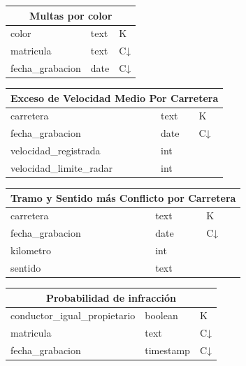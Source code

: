 \documentclass[]{article}
\begin{document}
\begin{minipage}{0.45\textwidth}
\begin{table}[H]
    \centering
    \begin{tabular}{lll} 
        \toprule
        \multicolumn{3}{c}{\large\textbf{Multas por color}} \\ 
        \midrule
        color            & text & K\\
        matricula        & text & C↓\\
        fecha\_grabacion & date & C↓\\
        \bottomrule
    \end{tabular}
\end{table}
\end{minipage}
\begin{minipage}{0.45\textwidth}
    \begin{table}[H]
        \centering
        \begin{tabular}{lll} 
            \toprule
            \multicolumn{3}{c}{\large\textbf{Exceso de Velocidad Medio Por Carretera}} \\ 
            \midrule
            carretera        & text & K\\
            fecha\_grabacion & date & C↓\\
            velocidad\_registrada & int & \\
            velocidad\_limite\_radar & int & \\
            \bottomrule
        \end{tabular}
    \end{table}
\end{minipage}

\begin{table}[H]
        \centering
        \begin{tabular}{lll} 
            \toprule
            \multicolumn{3}{c}{\large\textbf{Tramo y Sentido más Conflicto por Carretera}} \\ 
            \midrule
            carretera     & text & K\\
            fecha\_grabacion & date & C↓\\
            kilometro     & int & \\
            sentido       & text& \\
            \bottomrule
        \end{tabular}
    \end{table}
\begin{table}[H]
        \centering
        \begin{tabular}{lll} 
            \toprule
            \multicolumn{3}{c}{\large\textbf{Probabilidad de infracción}} \\ 
            \midrule
            conductor\_igual\_propietario & boolean & K\\
            matricula        & text      & C↓\\
            fecha\_grabacion & timestamp & C↓\\
            \bottomrule
        \end{tabular}
     \end{table}
\end{document}
